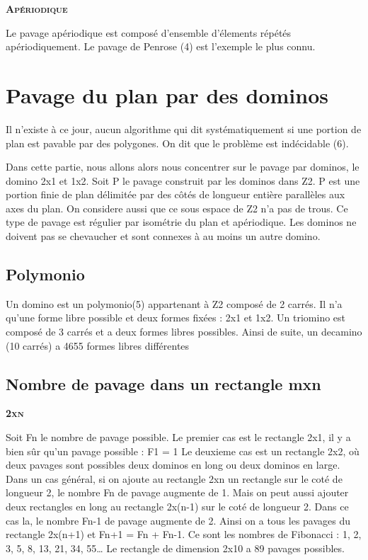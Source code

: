 \documentclass{article}
\begin{document}
\textbf{\textsc{Apériodique}}

Le pavage apériodique est composé d'ensemble d'élements répétés apériodiquement.
Le pavage de Penrose (4) est l'exemple le plus connu.



\section{Pavage du plan par des dominos}

Il n’existe à ce jour, aucun algorithme qui dit systématiquement si une portion de plan est pavable par des polygones.
On dit que le problème est indécidable (6).

Dans cette partie, nous allons alors nous concentrer sur le pavage par dominos, le domino 2x1 et 1x2.
Soit P le pavage construit par les dominos dans Z2. P est une portion finie de plan délimitée par des côtés de longueur entière parallèles aux axes du plan.
On considere aussi que ce sous espace de Z2 n’a pas de trous. Ce type de pavage est régulier par isométrie du plan et apériodique.
Les dominos ne doivent pas se chevaucher et sont connexes à au moins un autre domino.

\subsection{Polymonio}

Un domino est un polymonio(5) appartenant à Z2 composé de 2 carrés. Il n’a qu’une forme libre possible et deux formes fixées : 2x1 et 1x2.
Un triomino est composé de 3 carrés et a deux formes libres possibles.
Ainsi de suite, un decamino (10 carrés) a 4655 formes libres différentes

\subsection{Nombre de pavage dans un rectangle mxn}
\textbf{\textsc{2xn}}

Soit Fn le nombre de pavage possible.
Le premier cas est le rectangle 2x1, il y a bien sûr qu’un pavage possible : F1 = 1
Le deuxieme cas est un rectangle 2x2, où deux pavages sont possibles deux dominos en long ou deux dominos en large.
Dans un cas général, si on ajoute au rectangle 2xn un rectangle sur le coté de longueur 2, le nombre Fn de pavage augmente de 1.
Mais on peut aussi ajouter deux rectangles en long au rectangle 2x(n-1) sur le coté de longueur 2. Dans ce cas la, le nombre Fn-1 de pavage augmente de 2.
Ainsi on a tous les pavages du rectangle 2x(n+1) et Fn+1 = Fn + Fn-1.
Ce sont les nombres de Fibonacci : 1, 2, 3, 5, 8, 13, 21, 34, 55…
Le rectangle de dimension 2x10 a 89 pavages possibles.
\end{document}

